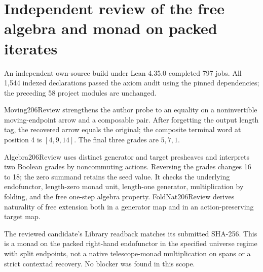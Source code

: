 \documentclass{article}
\begin{document}
\section*{Independent review of the free algebra and monad on packed iterates}
An independent own-source build under Lean 4.35.0 completed 797 jobs. All 1,544 indexed declarations passed the axiom audit using the pinned dependencies; the preceding 58 project modules are unchanged.
\par Moving206Review strengthens the author probe to an equality on a noninvertible moving-endpoint arrow and a composable pair. After forgetting the output length tag, the recovered arrow equals the original; the composite terminal word at position 4 is $[4,9,14]$. The final three grades are $5,7,1$.
\par Algebra206Review uses distinct generator and target presheaves and interprets two Boolean grades by noncommuting actions. Reversing the grades changes 16 to 18; the zero summand retains the seed value. It checks the underlying endofunctor, length-zero monad unit, length-one generator, multiplication by folding, and the free one-step algebra property. FoldNat206Review derives naturality of free extension both in a generator map and in an action-preserving target map.
\par The reviewed candidate's Library readback matches its submitted SHA-256. This is a monad on the packed right-hand endofunctor in the specified universe regime with split endpoints, not a native telescope-monad multiplication on spans or a strict contextad recovery. No blocker was found in this scope.
\end{document}
